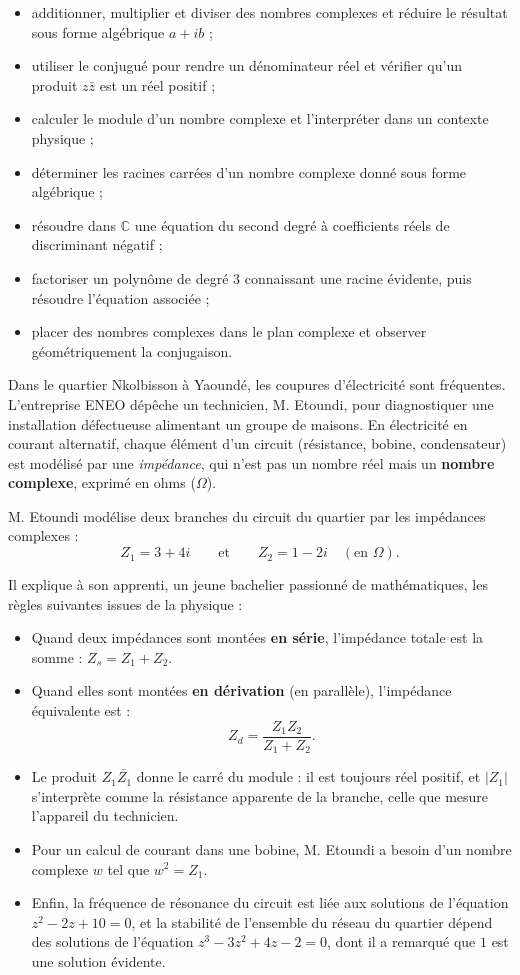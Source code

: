 \documentclass[11pt]{article}
\newcommand{\cle}[1]{{\popxbold\color{popdark}#1}}
\newcounter{popsec}
\newcounter{popsub}
\newcommand{\courssub}[1]{%
  \stepcounter{popsub}%
  \par\vspace{9pt}\noindent{\popxbold\fontsize{11.5}{13}\selectfont\color{popink}{\color{poporange}\thepopsec.\thepopsub}\hspace{6pt}#1}\par\nopagebreak\vspace{4pt}
}
\begin{document}
\begin{itemize}
\item additionner, multiplier et diviser des nombres complexes et réduire le résultat sous \cle{forme algébrique} $a + ib$ ;
\item utiliser le \cle{conjugué} pour rendre un dénominateur réel et vérifier qu'un produit $z\bar{z}$ est un réel positif ;
\item calculer le \cle{module} d'un nombre complexe et l'interpréter dans un contexte physique ;
\item déterminer les \cle{racines carrées} d'un nombre complexe donné sous forme algébrique ;
\item résoudre dans $\mathbb{C}$ une \cle{équation du second degré} à coefficients réels de discriminant négatif ;
\item \cle{factoriser} un polynôme de degré 3 connaissant une racine évidente, puis résoudre l'équation associée ;
\item placer des nombres complexes dans le \cle{plan complexe} et observer géométriquement la conjugaison.
\end{itemize}

\courssub{Situation}

Dans le quartier Nkolbisson à Yaoundé, les coupures d'électricité sont fréquentes. L'entreprise ENEO dépêche un technicien, M. Etoundi, pour diagnostiquer une installation défectueuse alimentant un groupe de maisons. En électricité en courant alternatif, chaque élément d'un circuit (résistance, bobine, condensateur) est modélisé par une \emph{impédance}, qui n'est pas un nombre réel mais un \textbf{nombre complexe}, exprimé en ohms ($\Omega$).

M. Etoundi modélise deux branches du circuit du quartier par les impédances complexes :
\[ Z_1 = 3 + 4i \qquad \text{et} \qquad Z_2 = 1 - 2i \quad (\text{en } \Omega). \]

Il explique à son apprenti, un jeune bachelier passionné de mathématiques, les règles suivantes issues de la physique :

\begin{itemize}
\item Quand deux impédances sont montées \textbf{en série}, l'impédance totale est la somme : $Z_s = Z_1 + Z_2$.
\item Quand elles sont montées \textbf{en dérivation} (en parallèle), l'impédance équivalente est :
\[ Z_d = \dfrac{Z_1 Z_2}{Z_1 + Z_2}. \]
\item Le produit $Z_1 \overline{Z_1}$ donne le carré du module : il est toujours réel positif, et $|Z_1|$ s'interprète comme la \og résistance apparente \fg{} de la branche, celle que mesure l'appareil du technicien.
\item Pour un calcul de courant dans une bobine, M. Etoundi a besoin d'un nombre complexe $w$ tel que $w^2 = Z_1$.
\item Enfin, la fréquence de résonance du circuit est liée aux solutions de l'équation $z^2 - 2z + 10 = 0$, et la stabilité de l'ensemble du réseau du quartier dépend des solutions de l'équation $z^3 - 3z^2 + 4z - 2 = 0$, dont il a remarqué que $1$ est une solution évidente.
\end{itemize}
\end{document}
